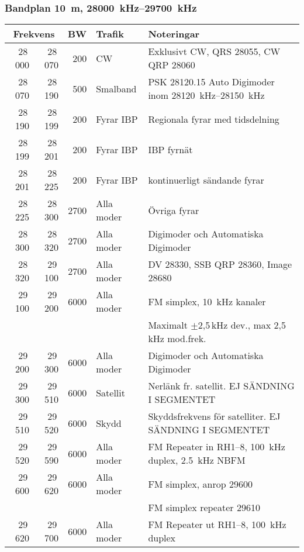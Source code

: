 \subsubsection{Bandplan \qty{10}{\metre}, \SIrange{28000}{29700}{\kilo\hertz}}
\begin{tabular}{rrrll}
\multicolumn{2}{c}{\textbf{Frekvens}} & \textbf{BW} & \textbf{Trafik} & \textbf{Noteringar} \\ \hline

28\,000 & 28\,070 & 200  & CW         & Exklusivt CW, QRS \num{28055}, CW QRP \num{28060}                  \\ \hline
28\,070 & 28\,190 & 500  & Smalband   & PSK \num{28120,15} Auto Digimoder inom \SIrange{28120}{28150}{\kilo\hertz} \\ \hline
28\,190 & 28\,199 & 200  & Fyrar IBP  & Regionala fyrar med tidsdelning                                    \\ \hline
28\,199 & 28\,201 & 200  & Fyrar IBP  & IBP fyrnät                                                         \\ \hline
28\,201 & 28\,225 & 200  & Fyrar IBP  & kontinuerligt sändande fyrar                                       \\ \hline
28\,225 & 28\,300 & 2700 & Alla moder & Övriga fyrar                                                       \\ \hline
28\,300 & 28\,320 & 2700 & Alla moder & Digimoder och Automatiska Digimoder                                \\ \hline
28\,320 & 29\,100 & 2700 & Alla moder & DV \num{28330}, SSB QRP \num{28360}, Image \num{28680}{}           \\
29\,100 & 29\,200 & 6000 & Alla moder & FM simplex, \qty{10}{\kilo\hertz} kanaler                                   \\
        &         &      &            & Maximalt $\pm$2,5\,kHz dev., max 2,5\,kHz mod.frek.                \\ \hline
29\,200 & 29\,300 & 6000 & Alla moder & Digimoder och Automatiska Digimoder                                \\ \hline
29\,300 & 29\,510 & 6000 & Satellit   & Nerlänk fr. satellit. EJ SÄNDNING I SEGMENTET                      \\ \hline
29\,510 & 29\,520 & 6000 & Skydd      & Skyddsfrekvens för satelliter. EJ SÄNDNING I SEGMENTET             \\ \hline
29\,520 & 29\,590 & 6000 & Alla moder & FM Repeater in RH1--8, \qty{100}{\kilo\hertz} duplex, \qty{2,5}{\kilo\hertz} NBFM    \\ \hline
29\,600 & 29\,620 & 6000 & Alla moder & FM simplex, anrop \num{29600}                                      \\
        &         &      &            & FM simplex repeater \num{29610}                                    \\ \hline
29\,620 & 29\,700 & 6000 & Alla moder & FM Repeater ut RH1--8, \qty{100}{\kilo\hertz} duplex                       \\ \hline
\end{tabular}
\newpage

